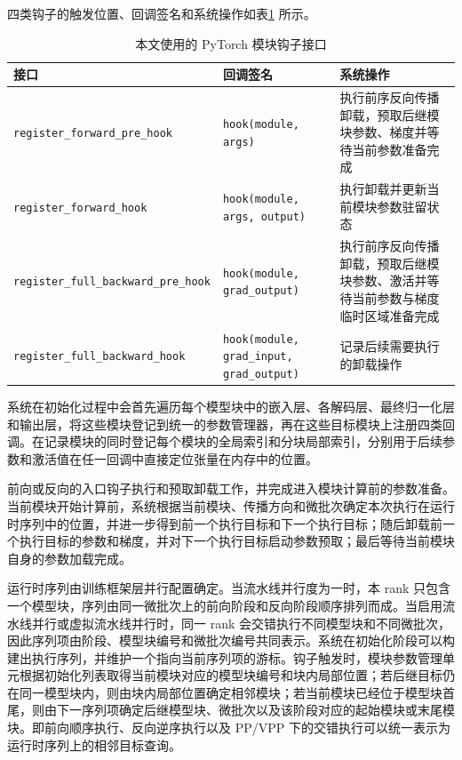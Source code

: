 \documentclass[bachelor,openany,oneside,color,AutoFakeBold=true]{buaathesis}
\begin{document}
四类钩子的触发位置、回调签名和系统操作如表\ref{tab:pytorch-hook-api} 所示。

\begin{table}[!htbp]
\centering
\caption{本文使用的 PyTorch 模块钩子接口}
\label{tab:pytorch-hook-api}
\begin{tabular}{p{}p{}p{}}
\toprule
接口 & 回调签名 & 系统操作 \\
\midrule
\texttt{register\_forward\_pre\_hook}
& \texttt{hook(module, args)}
& 执行前序反向传播卸载，预取后继模块参数、梯度并等待当前参数准备完成 \\
\texttt{register\_forward\_hook}
& \texttt{hook(module, args, output)}
& 执行卸载并更新当前模块参数驻留状态 \\
\texttt{register\_full\_backward\_pre\_hook}
& \texttt{hook(module, grad\_output)}
& 执行前序反向传播卸载，预取后继模块参数、激活并等待当前参数与梯度临时区域准备完成 \\
\texttt{register\_full\_backward\_hook}
& \texttt{hook(module, grad\_input, grad\_output)}
& 记录后续需要执行的卸载操作 \\
\bottomrule
\end{tabular}
\end{table}

系统在初始化过程中会首先遍历每个模型块中的嵌入层、各解码层、最终归一化层和输出层，将这些模块登记到统一的参数管理器，再在这些目标模块上注册四类回调。在记录模块的同时登记每个模块的全局索引和分块局部索引，分别用于后续参数和激活值在任一回调中直接定位张量在内存中的位置。

前向或反向的入口钩子执行和预取卸载工作，并完成进入模块计算前的参数准备。当前模块开始计算前，系统根据当前模块、传播方向和微批次确定本次执行在运行时序列中的位置，并进一步得到前一个执行目标和下一个执行目标；随后卸载前一个执行目标的参数和梯度，并对下一个执行目标启动参数预取；最后等待当前模块自身的参数加载完成。

运行时序列由训练框架层并行配置确定。当流水线并行度为一时，本 rank 只包含一个模型块，序列由同一微批次上的前向阶段和反向阶段顺序排列而成。当启用流水线并行或虚拟流水线并行时，同一 rank 会交错执行不同模型块和不同微批次，因此序列项由阶段、模型块编号和微批次编号共同表示。系统在初始化阶段可以构建出执行序列，并维护一个指向当前序列项的游标。钩子触发时，模块参数管理单元根据初始化列表取得当前模块对应的模型块编号和块内局部位置；若后继目标仍在同一模型块内，则由块内局部位置确定相邻模块；若当前模块已经位于模型块首尾，则由下一序列项确定后继模型块、微批次以及该阶段对应的起始模块或末尾模块。即前向顺序执行、反向逆序执行以及 PP/VPP 下的交错执行可以统一表示为运行时序列上的相邻目标查询。
\end{document}
